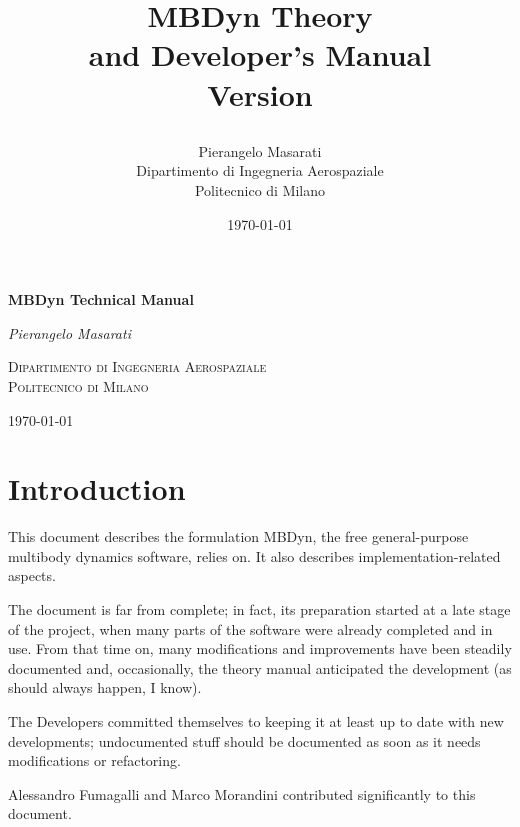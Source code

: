 \documentclass[10pt,dvips,fleqn,subeqn]{report}
\begin{document}
\begin{latexonly}
\title{\bf MBDyn Theory \\ and Developer's Manual \\
Version

}
\author{Pierangelo Masarati \vspace{5mm}\\
    \sc Dipartimento di Ingegneria Aerospaziale \\
    \sc Politecnico di Milano}
\date{\today}
\maketitle
\end{latexonly}

\begin{htmlonly}
\begin{center}
\textbf{\LARGE MBDyn Technical Manual}

\emph{\large Pierangelo Masarati}

\textsc{Dipartimento di Ingegneria Aerospaziale \\ Politecnico di Milano}

\today
\end{center}
\end{htmlonly}




\tableofcontents
\newpage
\listoffigures
\newpage
\listoftables
\newpage



\chapter{Introduction}
This document describes the formulation MBDyn,
the free general-purpose multibody dynamics software,
relies on.
It also describes implementation-related aspects.

The document is far from complete; in fact, its preparation
started at a late stage of the project, when many parts
of the software were already completed and in use.
From that time on, many modifications and improvements
have been steadily documented and, occasionally,
the theory manual anticipated the development
(as should always happen, I know).

The Developers committed themselves to keeping it at least up to date
with new developments; undocumented stuff should be documented
as soon as it needs modifications or refactoring.

Alessandro Fumagalli and Marco Morandini contributed significantly
to this document.
\end{document}
